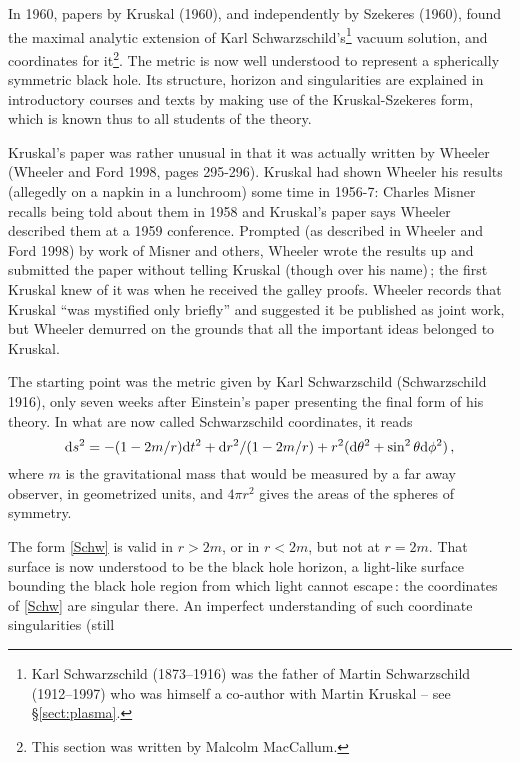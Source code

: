 \documentclass[11pt]{article}
\newcommand{\dx}{{\mbox{\rm d}}}
\begin{document}
In 1960, papers by Kruskal (1960), and independently by Szekeres (1960), found the maximal analytic extension 
of Karl Schwarzschild's\footnote{Karl Schwarzschild (1873--1916) was the father of Martin Schwarzschild (1912--1997) 
who was himself a co-author with Martin Kruskal -- see \S\ref{sect:plasma}.} vacuum solution, and coordinates for 
it\footnote{This section was written by Malcolm MacCallum.}. The metric is now well understood to represent a 
spherically symmetric black hole. Its structure, horizon and singularities are explained in introductory courses 
and texts by making use of the Kruskal-Szekeres form, which is known thus to all students of the theory. 
\par\smallskip%
Kruskal's paper was rather unusual in that it was actually written by Wheeler (Wheeler and Ford 
1998, pages 295-296). Kruskal had shown Wheeler his results (allegedly on a napkin in a lunchroom) some time in 
1956-7: Charles Misner recalls being told about them in 1958 and Kruskal's paper says Wheeler described them at 
a 1959 conference. Prompted (as described in Wheeler and Ford 1998) by work of Misner and others, Wheeler wrote 
the results up and submitted the paper without telling Kruskal (though over his name)\,; the first Kruskal knew 
of it was when he received the galley proofs. Wheeler records that Kruskal ``was mystified only briefly'' and 
suggested it be published as joint work, but Wheeler demurred on the grounds that all the important ideas belonged 
to Kruskal. 
\par\smallskip%
The starting point was the metric given by Karl Schwarzschild (Schwarzschild 1916), only seven weeks after Einstein's 
paper presenting the final form of his theory. In what are now called Schwarzschild coordinates, it reads
\begin{equation} \label{Schw}
\dx s^2 = - (1-2m/r)\dx t^2 + \dx r^2/(1-2m/r) + r^2 (\dx \theta^2+\sin^2 \theta\dx \phi^2)\,,
\end{equation}
where $m$ is the gravitational mass that would be measured by a far away observer, in geometrized units, and $4\pi r^2$ 
gives the areas of the spheres of symmetry. 
\par\smallskip%
The form \eqref{Schw} is valid in $r>2m$, or in $r<2m$, but not at $r=2m$. That surface is now understood to be 
the black hole horizon, a light-like surface bounding the black hole region from which light cannot escape\,: the 
coordinates of \eqref{Schw} are singular there. An imperfect understanding of such coordinate singularities (still 
\end{document}
